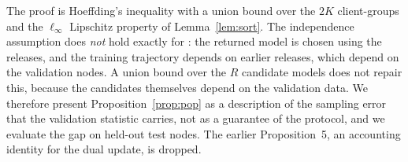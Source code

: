 The proof is Hoeffding's inequality with a union bound over the $2K$ client-groups and the $\ell_\infty$ Lipschitz property of Lemma~\ref{lem:sort}. The independence assumption does \emph{not} hold exactly for \rt{}: the returned model is chosen using the releases, and the training trajectory depends on earlier releases, which depend on the validation nodes. A union bound over the $R$ candidate models does not repair this, because the candidates themselves depend on the validation data. We therefore present Proposition~\ref{prop:pop} as a description of the sampling error that the validation statistic carries, not as a guarantee of the protocol, and we evaluate the gap on held-out test nodes. The earlier Proposition~5, an accounting identity for the dual update, is dropped.
